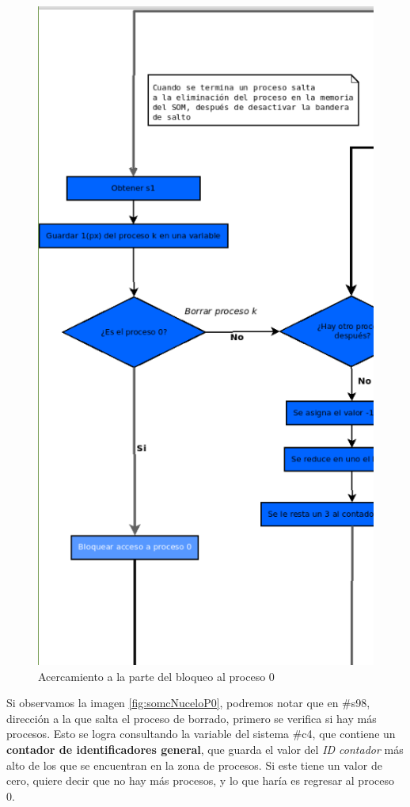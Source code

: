 \documentclass[letterpaper,12pt,oneside]{book}
\begin{document}
        \begin{figure}[h]		
			\centering
			\includegraphics[scale=0.42]{media/CARDIACC/diagBloquearProceso.png}
			\caption{ Acercamiento a la parte del bloqueo al proceso 0}
			\label{fig:diagBloqP0}
		\end{figure}
  
	   
		Si observamos  la imagen \ref{fig:somcNuceloP0}, podremos notar que en \#s98, dirección a la que salta el proceso de borrado, primero 
		se verifica si hay 
		más procesos. Esto
		se logra consultando la variable del sistema \#c4, que contiene un \textbf{contador de identificadores general}, que guarda el valor del 
		\textit{ID contador} más alto de los que
		se encuentran en la zona de procesos. Si este tiene un valor de cero, quiere decir que no hay más procesos, y lo que haría es regresar al 
		proceso 0.
\end{document}
